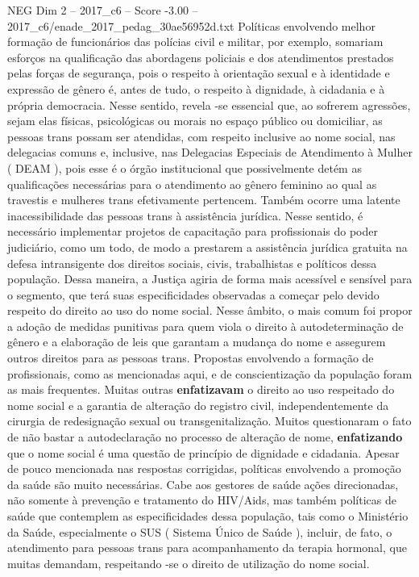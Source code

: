 \begin{textsample}{NEG Dim 2 – 2017\_c6 – Score -3.00 – 2017\_c6/enade\_2017\_pedag\_30ae56952d.txt}
Políticas envolvendo melhor formação de funcionários das polícias civil e militar, por exemplo, somariam esforços na qualificação das abordagens policiais e dos atendimentos prestados pelas forças de segurança, pois o respeito à orientação sexual e à identidade e expressão de gênero é, antes de tudo, o respeito à dignidade, à cidadania e à própria democracia.
Nesse sentido, revela -se essencial que, ao sofrerem agressões, sejam elas físicas, psicológicas ou morais no espaço público ou domiciliar, as pessoas trans possam ser atendidas, com respeito inclusive ao nome social, nas delegacias comuns e, inclusive, nas Delegacias Especiais de Atendimento à Mulher ( DEAM ), pois esse é o órgão institucional que possivelmente detém as qualificações necessárias para o atendimento ao gênero feminino ao qual as travestis e mulheres trans efetivamente pertencem.
Também ocorre uma latente inacessibilidade das pessoas trans à assistência jurídica.
Nesse sentido, é necessário implementar projetos de capacitação para profissionais do poder judiciário, como um todo, de modo a prestarem a assistência jurídica gratuita na defesa intransigente dos direitos sociais, civis, trabalhistas e políticos dessa população.
Dessa maneira, a Justiça agiria de forma mais acessível e sensível para o segmento, que terá suas especificidades observadas a começar pelo devido respeito do direito ao uso do nome social.
Nesse âmbito, o mais comum foi propor a adoção de medidas punitivas para quem viola o direito à autodeterminação de gênero e a elaboração de leis que garantam a mudança do nome e assegurem outros direitos para as pessoas trans.
Propostas envolvendo a formação de profissionais, como as mencionadas aqui, e de conscientização da população foram as mais frequentes.
Muitas outras \textbf{enfatizavam} o direito ao uso respeitado do nome social e a garantia de alteração do registro civil, independentemente da cirurgia de redesignação sexual ou transgenitalização.
Muitos questionaram o fato de não bastar a autodeclaração no processo de alteração de nome, \textbf{enfatizando} que o nome social é uma questão de princípio de dignidade e cidadania.
Apesar de pouco mencionada nas respostas corrigidas, políticas envolvendo a promoção da saúde são muito necessárias.
Cabe aos gestores de saúde ações direcionadas, não somente à prevenção e tratamento do HIV/Aids, mas também políticas de saúde que contemplem as especificidades dessa população, tais como o Ministério da Saúde, especialmente o SUS ( Sistema Único de Saúde ), incluir, de fato, o atendimento para pessoas trans para acompanhamento da terapia hormonal, que muitas demandam, respeitando -se o direito de utilização do nome social.

\end{textsample}

